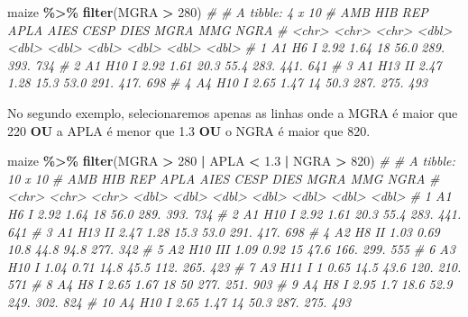 \documentclass[
]{book}
\newenvironment{Shaded}{\begin{snugshade}}{\end{snugshade}}
\newcommand{\CommentTok}[1]{\textcolor[rgb]{0.56,0.35,0.01}{\textit{#1}}}
\newcommand{\DecValTok}[1]{\textcolor[rgb]{0.00,0.00,0.81}{#1}}
\newcommand{\FloatTok}[1]{\textcolor[rgb]{0.00,0.00,0.81}{#1}}
\newcommand{\KeywordTok}[1]{\textcolor[rgb]{0.13,0.29,0.53}{\textbf{#1}}}
\newcommand{\NormalTok}[1]{#1}
\newcommand{\OperatorTok}[1]{\textcolor[rgb]{0.81,0.36,0.00}{\textbf{#1}}}
\newcommand{\StringTok}[1]{\textcolor[rgb]{0.31,0.60,0.02}{#1}}
\numberwithin{equation}{section}
\begin{document}
\begin{Shaded}
\begin{Highlighting}[]
\NormalTok{maize }\OperatorTok{\%\textgreater{}\%}\StringTok{ }
\StringTok{  }\KeywordTok{filter}\NormalTok{(MGRA }\OperatorTok{\textgreater{}}\StringTok{ }\DecValTok{280}\NormalTok{)}
\CommentTok{\# \# A tibble: 4 x 10}
\CommentTok{\#   AMB   HIB   REP    APLA  AIES  CESP  DIES  MGRA   MMG  NGRA}
\CommentTok{\#   \textless{}chr\textgreater{} \textless{}chr\textgreater{} \textless{}chr\textgreater{} \textless{}dbl\textgreater{} \textless{}dbl\textgreater{} \textless{}dbl\textgreater{} \textless{}dbl\textgreater{} \textless{}dbl\textgreater{} \textless{}dbl\textgreater{} \textless{}dbl\textgreater{}}
\CommentTok{\# 1 A1    H6    I      2.92  1.64  18    56.0  289.  393.   734}
\CommentTok{\# 2 A1    H10   I      2.92  1.61  20.3  55.4  283.  441.   641}
\CommentTok{\# 3 A1    H13   II     2.47  1.28  15.3  53.0  291.  417.   698}
\CommentTok{\# 4 A4    H10   I      2.65  1.47  14    50.3  287.  275.   493}
\end{Highlighting}
\end{Shaded}

No segundo exemplo, selecionaremos apenas as linhas onde a MGRA é maior que 220 \textbf{OU} a APLA é menor que 1.3 \textbf{OU} o NGRA é maior que 820.

\begin{Shaded}
\begin{Highlighting}[]
\NormalTok{maize }\OperatorTok{\%\textgreater{}\%}\StringTok{ }
\StringTok{  }\KeywordTok{filter}\NormalTok{(MGRA }\OperatorTok{\textgreater{}}\StringTok{ }\DecValTok{280} \OperatorTok{|}\StringTok{ }\NormalTok{APLA }\OperatorTok{\textless{}}\StringTok{ }\FloatTok{1.3} \OperatorTok{|}\StringTok{ }\NormalTok{NGRA }\OperatorTok{\textgreater{}}\StringTok{ }\DecValTok{820}\NormalTok{)}
\CommentTok{\# \# A tibble: 10 x 10}
\CommentTok{\#    AMB   HIB   REP    APLA  AIES  CESP  DIES  MGRA   MMG  NGRA}
\CommentTok{\#    \textless{}chr\textgreater{} \textless{}chr\textgreater{} \textless{}chr\textgreater{} \textless{}dbl\textgreater{} \textless{}dbl\textgreater{} \textless{}dbl\textgreater{} \textless{}dbl\textgreater{} \textless{}dbl\textgreater{} \textless{}dbl\textgreater{} \textless{}dbl\textgreater{}}
\CommentTok{\#  1 A1    H6    I      2.92  1.64  18    56.0 289.   393.   734}
\CommentTok{\#  2 A1    H10   I      2.92  1.61  20.3  55.4 283.   441.   641}
\CommentTok{\#  3 A1    H13   II     2.47  1.28  15.3  53.0 291.   417.   698}
\CommentTok{\#  4 A2    H8    II     1.03  0.69  10.8  44.8  94.8  277.   342}
\CommentTok{\#  5 A2    H10   III    1.09  0.92  15    47.6 166.   299.   555}
\CommentTok{\#  6 A3    H10   I      1.04  0.71  14.8  45.5 112.   265.   423}
\CommentTok{\#  7 A3    H11   I      1     0.65  14.5  43.6 120.   210.   571}
\CommentTok{\#  8 A4    H8    I      2.65  1.67  18    50   277.   251.   903}
\CommentTok{\#  9 A4    H8    I      2.95  1.7   18.6  52.9 249.   302.   824}
\CommentTok{\# 10 A4    H10   I      2.65  1.47  14    50.3 287.   275.   493}
\end{Highlighting}
\end{Shaded}
\end{document}
